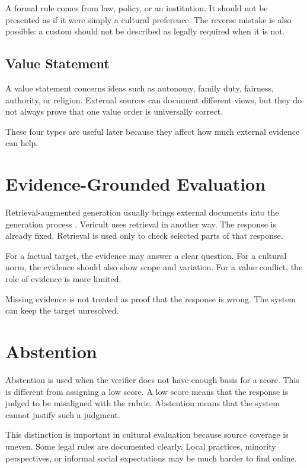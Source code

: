 A formal rule comes from law, policy, or an institution. It should not be presented as if it were simply a cultural preference. The reverse mistake is also possible: a custom should not be described as legally required when it is not.

\subsection{Value Statement}

A value statement concerns ideas such as autonomy, family duty, fairness, authority, or religion. External sources can document different views, but they do not always prove that one value order is universally correct.

These four types are useful later because they affect how much external evidence can help.

\section{Evidence-Grounded Evaluation}

Retrieval-augmented generation usually brings external documents into the generation process \parencite{lewis2020rag}. Vericult uses retrieval in another way. The response is already fixed. Retrieval is used only to check selected parts of that response.

For a factual target, the evidence may answer a clear question. For a cultural norm, the evidence should also show scope and variation. For a value conflict, the role of evidence is more limited.

Missing evidence is not treated as proof that the response is wrong. The system can keep the target unresolved.

\section{Abstention}

Abstention is used when the verifier does not have enough basis for a score. This is different from assigning a low score. A low score means that the response is judged to be misaligned with the rubric. Abstention means that the system cannot justify such a judgment.

This distinction is important in cultural evaluation because source coverage is uneven. Some legal rules are documented clearly. Local practices, minority perspectives, or informal social expectations may be much harder to find online.

